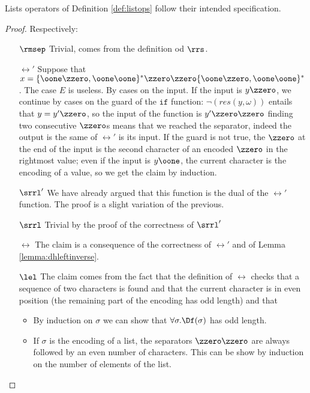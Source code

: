 \begin{conditional}{\notappendix}
    \begin{remark}
      \label{rem:corrlistops}
      Lists operators of Definition \ref{def:listops} follow their
      intended specification.
    \end{remark}
    \begin{proof}
      Respectively:
      \begin{itemize}
        \item [$\rmsep$] Trivial, comes from the definition od $\rrs$.
        \item [$\rel'$] Suppose that $x=\{\oone\zzero,
         \oone\oone\}^*\zzero\zzero\{\oone\zzero, \oone\oone\}^*$. The case $E$
         is useless. By cases on the input. If the input is $y\zzero$, we
         continue by cases on the guard of the $\mathtt{if}$ function:
         $\lnot (res(y, \omega))$ entails that $y=y'\zzero$, so the input of
         the function is $y'\zzero\zzero$ finding two consecutive $\zzero$s
         means that we reached the separator, indeed the output is the same
         of $\rel'$ is its input. If the guard is not true, the $\zzero$ at the end of the
         input is the second character of an encoded $\zzero$ in the rightmost
         value; even if the input is $y\oone$, the current character is the encoding
         of a value, so we get the claim by induction.
        \item[$\srrl'$] We have already argued that this function is the
        dual of the $\rel'$ function.
        The proof is a slight variation of the previous.
        \item[$\srrl$] Trivial by the proof of the correctness of $\srrl'$
        \item[$\rel$] The claim is a consequence of the correctness of $\rel'$
          and of Lemma \ref{lemma:dhleftinverse}.
        \item[$\lel$] The claim comes from the fact that the definition of $\rel$
        checks that a sequence of two characters is found and that the current
        character is in even position (the remaining part of the encoding has
        odd length) and that
        \begin{itemize}
          \item By induction on $\sigma$ we can show that
          $\forall \sigma.\Df(\sigma)$ has odd length.
          \item If $\sigma$ is the encoding of a list, the separators
          $\zzero\zzero$ are always followed by an even number of characters.
          This can be show by induction on the number of elements of the list.

\end{itemize}
\end{itemize}
\end{proof}
\end{conditional}
